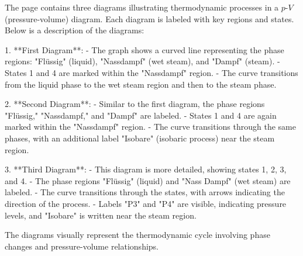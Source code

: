 The page contains three diagrams illustrating thermodynamic processes in a \( p \)-\( V \) (pressure-volume) diagram. Each diagram is labeled with key regions and states. Below is a description of the diagrams:

1. **First Diagram**:  
   - The graph shows a curved line representing the phase regions: "Flüssig" (liquid), "Nassdampf" (wet steam), and "Dampf" (steam).  
   - States 1 and 4 are marked within the "Nassdampf" region.  
   - The curve transitions from the liquid phase to the wet steam region and then to the steam phase.  

2. **Second Diagram**:  
   - Similar to the first diagram, the phase regions "Flüssig," "Nassdampf," and "Dampf" are labeled.  
   - States 1 and 4 are again marked within the "Nassdampf" region.  
   - The curve transitions through the same phases, with an additional label "Isobare" (isobaric process) near the steam region.  

3. **Third Diagram**:  
   - This diagram is more detailed, showing states 1, 2, 3, and 4.  
   - The phase regions "Flüssig" (liquid) and "Nass Dampf" (wet steam) are labeled.  
   - The curve transitions through the states, with arrows indicating the direction of the process.  
   - Labels "P3" and "P4" are visible, indicating pressure levels, and "Isobare" is written near the steam region.  

The diagrams visually represent the thermodynamic cycle involving phase changes and pressure-volume relationships.